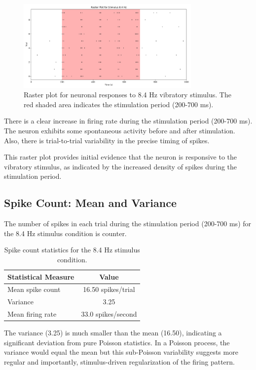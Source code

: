\documentclass{article}
\begin{document}
\begin{figure}[H]
\centering
\includegraphics[width=0.8\textwidth]{Fig4_8.4Hz.png}
\caption{Raster plot for neuronal responses to 8.4 Hz vibratory stimulus. The red shaded area indicates the stimulation period (200-700 ms).}
\label{fig:real_raster}
\end{figure}

There is a clear increase in firing rate during the stimulation period (200-700 ms). The neuron exhibits some spontaneous activity before and after stimulation.
Also, there is trial-to-trial variability in the precise timing of spikes. 


This raster plot provides initial evidence that the neuron is responsive to the vibratory stimulus, as indicated by the increased density of spikes during the stimulation period.

\subsection{Spike Count: Mean and Variance}

The number of spikes in each trial during the stimulation period (200-700 ms) for the 8.4 Hz stimulus condition is counter.


\begin{table}[H]
\centering
\begin{tabular}{lc}
\toprule
\textbf{Statistical Measure} & \textbf{Value} \\
\midrule
Mean spike count    & 16.50 spikes/trial \\
Variance            & 3.25 \\
Mean firing rate    & 33.0 spikes/second \\
\bottomrule
\end{tabular}
\caption{Spike count statistics for the 8.4 Hz stimulus condition.}
\label{tab:spike_count_stats}
\end{table}

The variance (3.25) is much smaller than the mean (16.50), indicating a significant deviation from pure Poisson statistics. 
In a Poisson process, the variance would equal the mean but this sub-Poisson variability suggests more regular and importantly, stimulus-driven regularization of the firing pattern.
\end{document}

